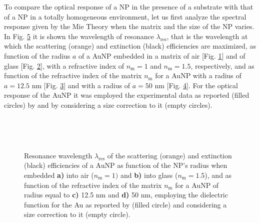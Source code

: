 
To compare the optical response of a NP in the presence of a substrate with that of a NP in a totally homogeneous environment, let us first analyze the spectral response given by the Mie Theory when the matrix and the size of the NP varies. In Fig. \ref{fig:Mie:redshift} it is shown the wavelength
 of resonance $\lambda_\text{res}$, that is the wavelength at which the scattering (orange) and extinction (black) efficiencies are maximized,  as function of the radius $a$ of a AuNP embedded in a matrix of air [Fig. \ref{sfig:red:1}] and of glass [Fig. \ref{sfig:red:2}], with a refractive index of $n_\text{m} = 1$ and $n_\text{m} = 1.5$, respectively, and as function of the refractive index of the matrix $n_\text{m}$ for a AuNP with a radius of {$a = 12.5$ nm} [Fig. \ref{sfig:red:3}] and with a radius of $a = 50$ nm [Fig. \ref{sfig:red:4}]. For the optical response of the AuNP it was employed the experimental data as reported (filled circles) by \citeauthor{johnson_optical_1972} \cite{johnson_optical_1972}  and by considering a size correction to it (empty circles).

\begin{figure}[h!] \centering
    \def\svgwidth{.9\textwidth}
    \vspace*{-18.6em} \\
    \hspace*{-5.9em}%
        \begin{subfigure}{.20\textwidth}\caption{ }\label{sfig:red:1}\end{subfigure}%
        \begin{subfigure}{.235\textwidth}\caption{ }\label{sfig:red:2}\end{subfigure}%
        \begin{subfigure}{.20\textwidth}\caption{ }\label{sfig:red:3}\end{subfigure}%
        \begin{subfigure}{.24\textwidth}\caption{ }\label{sfig:red:4}\end{subfigure}
    \vspace*{16em}\\
    \caption[Spectral redshift of the scattering and extinction  efficiencies of a spherical AuNP as function of its size and the embedding media]{Resonance wavelength $\lambda_\text{res}$ of the scattering (orange) and extinction (black) efficiencies of a AuNP as function of the NP's radius when embedded \textbf{a)} into air ($n_\text{m} = 1)$ and \textbf{b)} into glass ($n_\text{m} = 1.5$), and as function of the refractive index of the matrix  $n_\text{m}$ for a AuNP of radius equal to  \textbf{c)} 12.5 nm and \textbf{d)} 50 nm, employing the dielectric function for the Au as reported by \citeauthor{johnson_optical_1972} (filled circle) and considering a size correction to it (empty circle).}
    \label{fig:Mie:redshift}
\end{figure}

